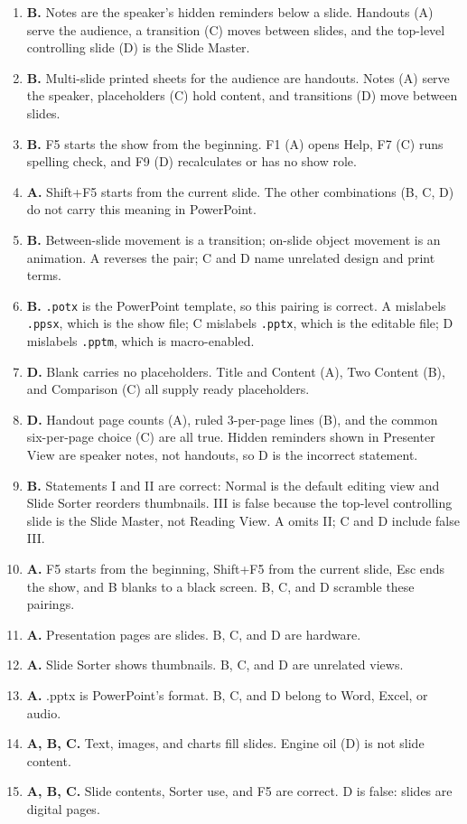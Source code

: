 \documentclass[11pt]{article}
\begin{document}
\begin{enumerate}[label=\textbf{Q\arabic*.}, leftmargin=*]
  reordering. Normal (A) edits one slide, Notes Page (B) pairs a slide with
  notes, and Outline View (D) shows text only.
\item \textbf{B.} Notes are the speaker's hidden reminders below a slide.
  Handouts (A) serve the audience, a transition (C) moves between slides,
  and the top-level controlling slide (D) is the Slide Master.
\item \textbf{B.} Multi-slide printed sheets for the audience are handouts.
  Notes (A) serve the speaker, placeholders (C) hold content, and
  transitions (D) move between slides.
\item \textbf{B.} F5 starts the show from the beginning. F1 (A) opens Help,
  F7 (C) runs spelling check, and F9 (D) recalculates or has no show role.
\item \textbf{A.} Shift+F5 starts from the current slide. The other
  combinations (B, C, D) do not carry this meaning in PowerPoint.
\item \textbf{B.} Between-slide movement is a transition; on-slide object
  movement is an animation. A reverses the pair; C and D name unrelated
  design and print terms.
\item \textbf{B.} \texttt{.potx} is the PowerPoint template, so this pairing
  is correct. A mislabels \texttt{.ppsx}, which is the show file; C mislabels
  \texttt{.pptx}, which is the editable file; D mislabels \texttt{.pptm},
  which is macro-enabled.
\item \textbf{D.} Blank carries no placeholders. Title and Content (A), Two
  Content (B), and Comparison (C) all supply ready placeholders.
\item \textbf{D.} Handout page counts (A), ruled 3-per-page lines (B), and
  the common six-per-page choice (C) are all true. Hidden reminders shown in
  Presenter View are speaker notes, not handouts, so D is the incorrect
  statement.
\item \textbf{B.} Statements I and II are correct: Normal is the default
  editing view and Slide Sorter reorders thumbnails. III is false because
  the top-level controlling slide is the Slide Master, not Reading View. A
  omits II; C and D include false III.
\item \textbf{A.} F5 starts from the beginning, Shift+F5 from the current
  slide, Esc ends the show, and B blanks to a black screen. B, C, and D
  scramble these pairings.

\item \textbf{A.} Presentation pages are slides. B, C, and D are hardware.
\item \textbf{A.} Slide Sorter shows thumbnails. B, C, and D are unrelated views.
\item \textbf{A.} .pptx is PowerPoint's format. B, C, and D belong to Word, Excel, or audio.
\item \textbf{A, B, C.} Text, images, and charts fill slides. Engine oil (D) is not slide content.
\item \textbf{A, B, C.} Slide contents, Sorter use, and F5 are correct. D is false: slides are digital pages.
\end{enumerate}
\def\JKSSBLessonID{31}\def\JKSSBAnswers{1}
\end{document}
